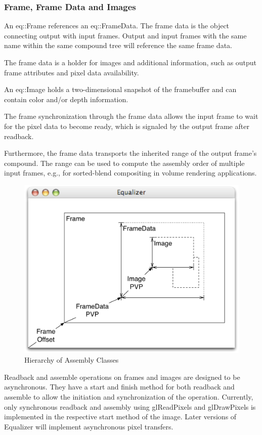 \documentclass[10pt,a4]{scrartcl}
\begin{document}
\subsubsection{Frame, Frame Data and Images}

An \textsf{eq::Frame} references an \textsf{eq::Fra\-me\-Data}. The
frame data is the object connecting output with input frames. Output and
input frames with the same name within the same compound tree will
reference the same frame data.

The frame data is a holder for images and additional information, such
as output frame attributes and pixel data availability.

An \textsf{eq::Image} holds a two-dimensional snapshot of the framebuffer and
can contain color and/or depth information.

The frame synchronization through the frame data allows the input frame
to wait for the pixel data to become ready, which is signaled by the
output frame after readback.

Furthermore, the frame data transports the inherited range of the output
frame's compound. The range can be used to compute the assembly order of
multiple input frames, e.g., for sorted-blend compositing in volume
rendering applications.

\begin{figure}
  \includegraphics[width=.618\textwidth]{images/assembly.pdf}
  {\caption{\label{fAssembly}Hierarchy of Assembly Classes}}
\end{figure}
Readback and assemble operations on frames and images are designed to be
asynchronous. They have a start and finish method for both readback and
assemble to allow the initiation and synchronization of the operation.
Currently, only synchronous readback and assembly using
\textsf{glReadPixels} and \textsf{glDrawPixels} is implemented in the
respective start method of the image. Later versions of Equalizer will
implement asynchronous pixel transfers.
\end{document}
